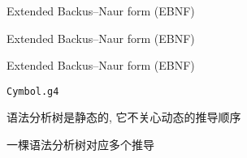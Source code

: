 \begin{frame}{}
  \begin{center}
    Extended Backus–Naur form (EBNF)
  \end{center}

  \vspace{0.50cm}
  \begin{center}
  \end{center}
\end{frame}

\begin{frame}{}
  \begin{center}
    Extended Backus–Naur form (EBNF)
  \end{center}

  \vspace{0.50cm}
  \begin{center}
  \end{center}
\end{frame}

\begin{frame}{}
  \begin{center}
    Extended Backus–Naur form (EBNF)
  \end{center}

  \vspace{0.50cm}
  \begin{center}
  \end{center}
\end{frame}

\begin{frame}{}

  \begin{center}
    \texttt{Cymbol.g4}
  \end{center}
\end{frame}

\begin{frame}{}
  \begin{center}

    \vspace{0.30cm}
    语法分析树是静态的, 它不关心动态的推导顺序


    一棵语法分析树对应多个推导
  \end{center}
\end{frame}


